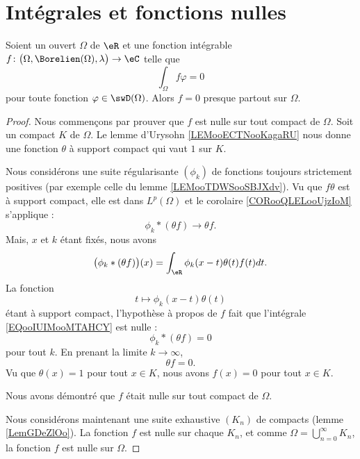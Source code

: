\section{Intégrales et fonctions nulles}


\begin{proposition} \label{PropAAjSURG}
	Soient un ouvert \( \Omega\) de \( \eR\) et une fonction intégrable \( f\colon \big( \Omega,\Borelien(\Omega),\lambda \big)\to \eC\) telle que
	\begin{equation}
		\int_{\Omega}f\varphi=0
	\end{equation}
	pour toute fonction \( \varphi\in\swD(\Omega)\). Alors \( f=0\) presque partout sur \( \Omega\).
\end{proposition}

\begin{proof}
	Nous commençons par prouver que \( f\) est nulle sur tout compact de \( \Omega\). Soit un compact \( K\) de \( \Omega\). Le lemme d'Urysohn \ref{LEMooECTNooKagaRU} nous donne une fonction \( \theta\) à support compact qui vaut \( 1\) sur \( K\).

	Nous considérons une suite régularisante \( (\phi_k)\) de fonctions toujours strictement positives (par exemple celle du lemme \ref{LEMooTDWSooSBJXdv}). Vu que \( f\theta\) est à support compact, elle est dans \( L^p(\Omega)\) et le corolaire \ref{CORooQLELooUjzIoM} s'applique :
	\begin{equation}
		\phi_k*(\theta f)\to \theta f.
	\end{equation}
	Mais, \( x\) et \( k\) étant fixés, nous avons
	\begin{equation}        \label{EQooIUIMooMTAHCY}
		\big( \phi_k* (\theta f) \big)(x)=\int_{\eR}\phi_k(x-t)\theta(t)f(t)dt.
	\end{equation}
	La fonction
	\begin{equation}
		t\mapsto \phi_k(x-t)\theta(t)
	\end{equation}
	étant à support compact, l'hypothèse à propos de \( f\) fait que l'intégrale \eqref{EQooIUIMooMTAHCY} est nulle :
	\begin{equation}
		\phi_k*(\theta f)=0
	\end{equation}
	pour tout \( k\). En prenant la limite \( k\to \infty\),
	\begin{equation}
		\theta f=0.
	\end{equation}
	Vu que \( \theta(x)=1\) pour tout \( x\in K\), nous avons \( f(x)=0\) pour tout \( x\in K\).

	Nous avons démontré que \( f\) était nulle sur tout compact de \( \Omega\).

	Nous considérons maintenant une suite exhaustive \( (K_n)\) de compacts (lemme \ref{LemGDeZlOo}). La fonction \( f\) est nulle sur chaque \( K_n\), et comme \( \Omega=\bigcup_{n=0}^{\infty}K_n\), la fonction \( f\) est nulle sur \( \Omega\).
\end{proof}



